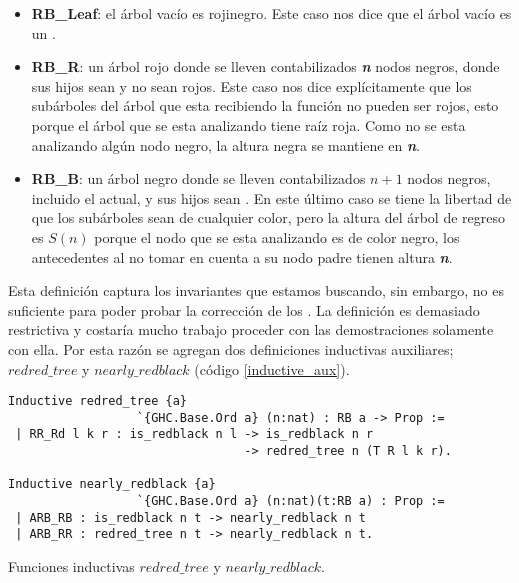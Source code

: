 \begin{itemize}
        \item \textbf{RB\_Leaf}: el árbol vac\'io es rojinegro. Este caso nos dice que el \'arbol
        vacío es un {\arn}.
        \item \textbf{RB\_R}: un árbol rojo donde se lleven contabilizados \textbf{\textit{n}} nodos 
        negros, donde sus hijos sean {\arns} y no sean rojos. Este caso nos dice explícitamente que 
        los subárboles del árbol que esta recibiendo la función no pueden ser rojos, esto porque el 
        árbol que se esta analizando tiene raíz roja. Como no se esta analizando algún nodo negro, 
        la altura negra se mantiene en \textbf{\textit{n}}.
        \item \textbf{RB\_B}: un árbol negro donde se lleven contabilizados $n+1$ nodos negros, 
        incluido el actual, y sus hijos sean {\arns}. En este \'ultimo caso se tiene la libertad de 
        que los subárboles sean de cualquier color, pero la altura del \'arbol de regreso es $S(n)$ 
        porque el nodo que se esta analizando es de color negro, los antecedentes al no tomar en 
        cuenta a su nodo padre tienen altura \textbf{\textit{n}}.
\end{itemize}

Esta definici\'on captura los invariantes que estamos buscando, sin embargo, no es suficiente para
poder probar la correcci\'on de los {\arns}. La definici\'on es demasiado restrictiva y costaría 
mucho trabajo proceder con las demostraciones solamente con ella. Por esta razón se agregan dos
definiciones inductivas auxiliares; \hyperref[inductive_isRedB]{$redred\_tree$} y 
\hyperref[inductive_isRedB]{$nearly\_redblack$} (c\'odigo \ref{inductive_aux}).

\begin{listing}[!ht]
\centering
\captionsetup{justification=centering}
\begin{verbatim}
Inductive redred_tree {a}
                  `{GHC.Base.Ord a} (n:nat) : RB a -> Prop :=
 | RR_Rd l k r : is_redblack n l -> is_redblack n r
                                 -> redred_tree n (T R l k r).

Inductive nearly_redblack {a}
                  `{GHC.Base.Ord a} (n:nat)(t:RB a) : Prop :=
 | ARB_RB : is_redblack n t -> nearly_redblack n t
 | ARB_RR : redred_tree n t -> nearly_redblack n t.
\end{verbatim}
\caption{Funciones inductivas \hyperref[inductive_isRedB]{$redred\_tree$} y 
\hyperref[inductive_isRedB]{$nearly\_redblack$}.}
\label{inductive_aux}
\end{listing}

